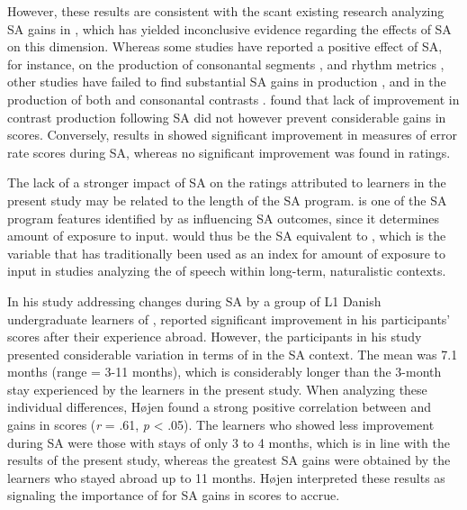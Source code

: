 \documentclass[output=paper]{langsci/langscibook}
\begin{document}
However, these results are consistent with the scant existing research analyzing SA gains in  , which has yielded inconclusive evidence regarding the effects of SA on this dimension. Whereas some studies have reported a positive effect of SA, for instance, on the production of consonantal segments \citep{Díaz-Campos2004,Díaz-Campos2006,Mora2008,SanzEtAl2013}, and rhythm metrics \citep{Valls-Ferrer2011}, other studies have failed to find substantial SA gains in  production \citep{Simões1996,Avello2010a,Pérez-VidalEtAl2011}, and in the production of both  and consonantal contrasts \citep{Højen2003}. \citet{Avello2010b} found that lack of improvement in  contrast production following SA did not however prevent considerable gains in  scores. Conversely, results in \citet{AvelloEtAl2012} showed significant improvement in  measures of error rate scores during SA, whereas no significant improvement was found in  ratings. 

The lack of a stronger impact of SA on the  ratings attributed to  learners in the present study may be related to the length of the SA program.  is one of the SA program features identified by \citet{Pérez-VidalJuan-Garau2011} as influencing SA outcomes, since it determines amount of exposure to  input.  would thus be the SA equivalent to , which is the variable that has traditionally been used as an index for amount of exposure to  input in  studies analyzing the  of  speech within long-term, naturalistic  contexts. 

In his study addressing  changes during SA by a group of L1 Danish undergraduate learners of , \cite{Højen2003} reported significant improvement in his participants’  scores after their experience abroad. However, the participants in his study presented considerable variation in terms of  in the SA context. The mean  was 7.1 months (range = 3-11 months), which is considerably longer than the 3-month stay experienced by the learners in the present study. When analyzing these individual differences, Højen found a strong positive correlation between  and gains in  scores (\textit{r} = .61, \textit{p} < .05). The learners who showed less improvement during SA were those with stays of only 3 to 4 months, which is in line with the results of the present study, whereas the greatest SA gains were obtained by the learners who stayed abroad up to 11 months. Højen interpreted these results as signaling the importance of  for SA gains in  scores to accrue.
\end{document}
